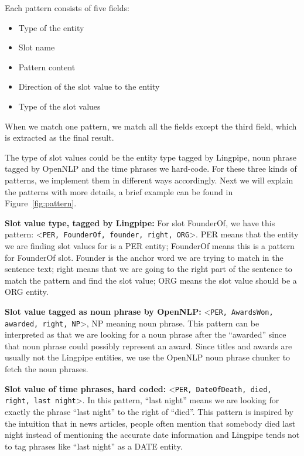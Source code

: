 Each pattern consists of five fields:

\begin{itemize}
\item Type of the entity
\item Slot name
\item Pattern content
\item Direction of the slot value to the entity
\item Type of the slot values
\end{itemize}

 When we match one pattern, we match all the 
fields except the third field, which is extracted as the final result.

 The type of slot values could be the entity 
type tagged by Lingpipe, noun phrase tagged by OpenNLP and the time phrases we 
hard-code. For these three kinds of patterns, we implement them in different 
ways accordingly. Next we will explain the patterns with more details, a brief
example can be found in Figure~\ref{fig:pattern}. 

\textbf{Slot value type, tagged by Lingpipe:} For slot FounderOf, we have this
pattern: \textless \texttt{PER, FounderOf, founder, right, ORG}\textgreater. PER means 
that the entity we are finding slot values for is a PER entity; FounderOf 
means this is a pattern for FounderOf slot. Founder is the anchor word we are 
trying to match in the sentence text; right means that we are going to the 
right part of the sentence to match the pattern and find the slot value; ORG 
means the slot value should be a ORG entity.

\textbf{Slot value tagged as noun phrase by OpenNLP:} \textless \texttt{PER, AwardsWon, awarded, 
right, NP}\textgreater, NP meaning noun phrase. This pattern can be interpreted 
as that we are looking for a noun phrase after the “awarded'' since that noun 
phrase could possibly represent an award. Since titles and awards are usually 
not the Lingpipe entities, we use the OpenNLP noun phrase chunker to fetch the 
noun phrases.

\textbf{Slot value of time phrases, hard coded:} \textless \texttt{PER, DateOfDeath, died, right, 
last night}\textgreater. In this pattern, “last night'' means we are looking for 
exactly the phrase ``last night'' to the right of ``died''. This pattern is 
inspired by the intuition that in news articles, people often mention that 
somebody died last night instead of mentioning the accurate date information 
and Lingpipe tends not to tag phrases like ``last night'' as a DATE entity. 

